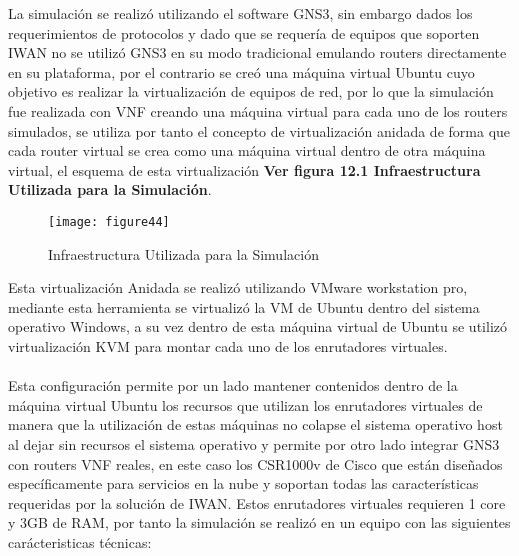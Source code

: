 La simulación se realizó utilizando el software GNS3, sin embargo dados los requerimientos de protocolos y dado que se requería de equipos que soporten IWAN no se utilizó GNS3 en su modo tradicional emulando routers directamente en su plataforma, por el contrario se creó una máquina virtual Ubuntu cuyo objetivo es realizar la virtualización de equipos de red, por lo que la simulación fue realizada con VNF creando una máquina virtual para cada uno de los routers simulados, se utiliza por tanto el concepto de virtualización anidada de forma que cada router virtual se crea como una máquina virtual dentro de otra máquina virtual, el esquema de esta virtualización \textbf{Ver figura 12.1 Infraestructura Utilizada para la Simulación}.
\begin{figure}[htbp]
  \centering
    {\texttt{[image: figure44]}}%
  \caption{Infraestructura Utilizada para la Simulación}
  \label{fig:fig2subfig}
\end{figure}
Esta virtualización Anidada se realizó utilizando VMware workstation pro, mediante esta herramienta se virtualizó la VM de Ubuntu dentro del sistema operativo Windows, a su vez dentro de esta máquina virtual de Ubuntu se utilizó virtualización KVM para montar cada uno de los enrutadores virtuales.
\\
\\
Esta configuración permite por un lado mantener contenidos dentro de la máquina virtual Ubuntu los recursos que utilizan los enrutadores virtuales de manera que la utilización de estas máquinas no colapse el sistema operativo host al dejar sin recursos el sistema operativo y permite por otro lado integrar GNS3 con routers VNF reales, en este caso los CSR1000v de Cisco que están diseñados específicamente para servicios en la nube y soportan todas las características requeridas por la solución de IWAN. Estos enrutadores virtuales requieren 1 core y 3GB de RAM, por tanto la simulación se realizó en un equipo con las siguientes carácteristicas técnicas:

